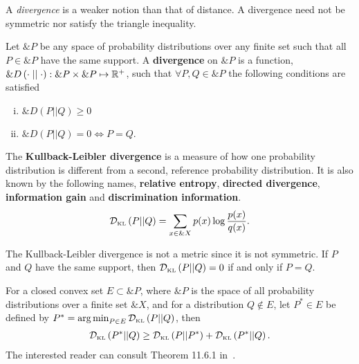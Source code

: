 \begin{remark}
  A \textit{divergence} is a weaker notion than that of distance. A divergence
  need not be symmetric nor satisfy the triangle inequality.
\end{remark}

\begin{definition}
  Let $\&P$ be any space of probability distributions over any finite set such
  that all
  $P \in \&P$ have the same support. A \textbf{divergence} on $\&P$ is a
  function, $\&D\left( \cdot \mid\mid \cdot \right): \&P \times \&P \mapsto
  \mathbb{R}^+$, such that $\forall P, Q \in \&P$ the following conditions are
  satisfied
  \begin{enumerate}[(i)]
  \item $\&D(P||Q) \geq 0$
  \item $\&D(P||Q) = 0 \iff P = Q$.
  \end{enumerate}
\end{definition}

\begin{definition}
  The \textbf{Kullback-Leibler divergence} is a measure of how one probability
  distribution is different from a second, reference probability distribution.
  It is also known by the following names, \textbf{relative entropy},
  \textbf{directed divergence}, \textbf{information gain} and
  \textbf{discrimination information}.
  \begin{align}
    \label{eq:KL}
    \mathcal{D}_{\text{\tiny KL}}\left( P \middle| \middle| Q \right) = \sum_{x \in \&X} p(x) \log{p(x) \over q(x)}.
  \end{align}
\end{definition}

The Kullback-Leibler divergence is not a metric since it is not symmetric. If
$P$ and $Q$ have the same support, then $\mathcal{D}_{\text{\tiny KL}}\left( P \middle| \middle| Q \right) = 0$ if and only if $P = Q$.

\begin{theorem}
  For a closed convex set $E \subset \&P$, where $\&P$ is the space of
  all probability distributions over a finite set $\&X$, and for a
  distribution $Q \not \in E$, let $P^* \in E$ be defined by
  $P^* = \operatorname*{arg\,min}_{P \in E} \mathcal{D}_{\text{\tiny KL}}\left( P \middle| \middle| Q \right)$, then
  \begin{align}
   \mathcal{D}_{\text{\tiny KL}}\left( P^* \middle| \middle| Q \right) \geq \mathcal{D}_{\text{\tiny KL}}\left( P \middle| \middle| P^* \right) + \mathcal{D}_{\text{\tiny KL}}\left( P^* \middle| \middle| Q \right).
  \end{align}
  The interested reader can consult Theorem 11.6.1 in~\cite{ref:cover-thomas}.
\end{theorem}

